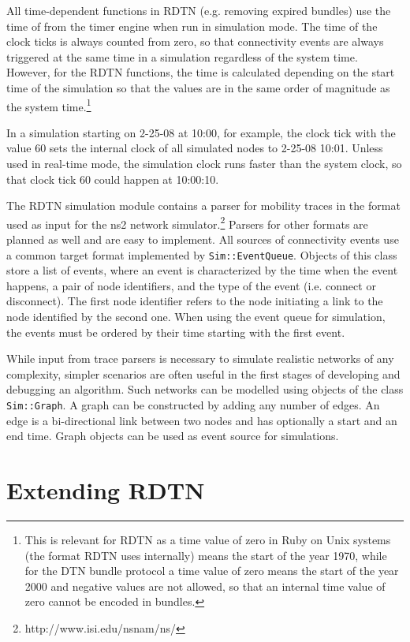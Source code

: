 \documentclass{article}
\begin{document}
All time-dependent functions in RDTN (e.g. removing expired bundles) use the
time of from the timer engine when run in simulation mode.  The time of the
clock ticks is always counted from zero, so that connectivity events are always
triggered at the same time in a simulation regardless of the system time.
However, for the RDTN functions, the time is calculated depending on the start
time of the simulation so that the values are in the same order of magnitude as
the system time.\footnote{This is relevant for RDTN as a time value of zero in
Ruby on Unix systems (the format RDTN uses internally) means the start of the
year 1970, while for the DTN bundle protocol a time value of zero means the
start of the year 2000 and negative values are not allowed, so that an internal
time value of zero cannot be encoded in bundles.}

In a simulation starting on 2-25-08 at 10:00, for example, the clock tick
with the value $60$ sets the internal clock of all simulated nodes to 2-25-08
10:01. Unless used in real-time mode, the simulation clock runs faster than the
system clock, so that clock tick $60$ could happen at 10:00:10.

The RDTN simulation module contains a parser for mobility traces in the format
used as input for the ns2 network
simulator.\footnote{http://www.isi.edu/nsnam/ns/} Parsers for other formats are
planned as well and are easy to implement. All sources of connectivity events
use a common target format implemented by {\tt Sim::EventQueue}. Objects of this
class store a list of events, where an event is characterized by the time when
the event happens, a pair of node identifiers, and the type of the event (i.e.
connect or disconnect). The first node identifier refers to the node initiating
a link to the node identified by the second one. When using the event queue for
simulation, the events must be ordered by their time starting with the first
event.

While input from trace parsers is necessary to simulate realistic networks of
any complexity, simpler scenarios are often useful in the first stages of
developing and debugging an algorithm. Such networks can be modelled using
objects of the class {\tt Sim::Graph}. A graph can be constructed by adding any
number of edges. An edge is a bi-directional link between two nodes and has
optionally a start and an end time. Graph objects can be used as event source
for simulations.

\section{Extending RDTN}\label{sec.extending}
\end{document}
